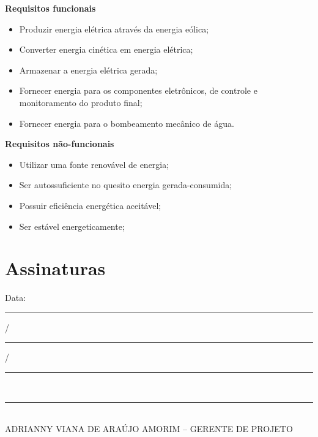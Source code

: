 \begin{itemize}
	\textbf{Requisitos funcionais}
	\begin{itemize}
	  \item Produzir energia elétrica através da energia eólica;
	  \item Converter energia cinética em energia elétrica;
	  \item Armazenar a energia elétrica gerada;
	  \item Fornecer energia para os componentes eletrônicos, de controle e monitoramento do produto final;
	  \item Fornecer energia para o bombeamento mecânico de água.
	\end{itemize}
	
	\textbf{Requisitos não-funcionais}
	\begin{itemize}
	  \item Utilizar uma fonte renovável de energia;
	  \item Ser autossuficiente no quesito energia gerada-consumida;
	  \item Possuir eficiência energética aceitável;
	  \item Ser estável energeticamente;
	\end{itemize}
	
    \end{itemize}
  
\section*{Assinaturas}

  \begin{center}
  Data: \rule{0.5cm}{0.1mm}/\rule{0.5cm}{0.1mm}/\rule{1cm}{0.1mm}     \\
  \rule{13cm}{0.1mm}\\
  ADRIANNY VIANA DE ARAÚJO AMORIM – GERENTE DE PROJETO\\


\end{center}
% 